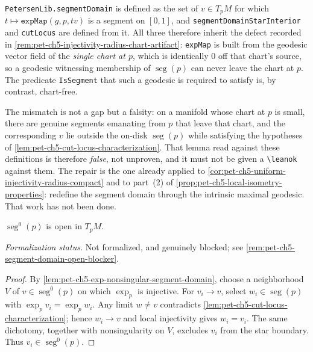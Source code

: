 \begin{remark}
  \label{rem:pet-ch5-segment-domain-chart-artifact}
  \texttt{PetersenLib.segmentDomain} is defined as the set of $v\in T_pM$ for which
  $t\mapsto\texttt{expMap}(g,p,tv)$ is a segment on $[0,1]$, and
  \texttt{segmentDomainStarInterior} and \texttt{cutLocus} are defined from it.
  All three therefore inherit the defect recorded in
  \cref{rem:pet-ch5-injectivity-radius-chart-artifact}: \texttt{expMap} is built
  from the geodesic vector field of the \emph{single chart at $p$}, which is
  identically $0$ off that chart's source, so a geodesic witnessing membership of
  $\operatorname{seg}(p)$ can never leave the chart at $p$. The predicate
  \texttt{IsSegment} that such a geodesic is required to satisfy is, by contrast,
  chart-free.

  The mismatch is not a gap but a falsity: on a manifold whose chart at $p$ is
  small, there are genuine segments emanating from $p$ that leave that chart, and
  the corresponding $v$ lie outside the on-disk $\operatorname{seg}(p)$ while
  satisfying the hypotheses of \cref{lem:pet-ch5-cut-locus-characterization}. That
  lemma read against these definitions is therefore \emph{false}, not unproven, and
  it must not be given a \texttt{\textbackslash leanok} against them. The repair is
  the one already applied to
  \cref{cor:pet-ch5-uniform-injectivity-radius-compact} and to part~(2) of
  \cref{prop:pet-ch5-local-isometry-properties}: redefine the segment domain
  through the intrinsic maximal geodesic. That work has not been done.
\end{remark}

\begin{proposition}
  \label{prop:pet-ch5-segment-domain-open}


  $\operatorname{seg}^0(p)$ is open in $T_pM$.

  \emph{Formalization status.} Not formalized, and genuinely blocked; see
  \cref{rem:pet-ch5-segment-domain-open-blocker}.
\end{proposition}
\begin{proof}
  \sketch
  By \cref{lem:pet-ch5-exp-nonsingular-segment-domain}, choose a neighborhood $V$
  of $v\in\operatorname{seg}^0(p)$ on which $\exp_p$ is injective.  For
  $v_i\to v$, select $w_i\in\operatorname{seg}(p)$ with
  $\exp_pv_i=\exp_pw_i$.  Any limit $w\ne v$ contradicts
  \cref{lem:pet-ch5-cut-locus-characterization}; hence $w_i\to v$ and local
  injectivity gives $w_i=v_i$.  The same dichotomy, together with nonsingularity
  on $V$, excludes $v_i$ from the star boundary.  Thus $v_i\in\operatorname{seg}^0(p)$.
\end{proof}

